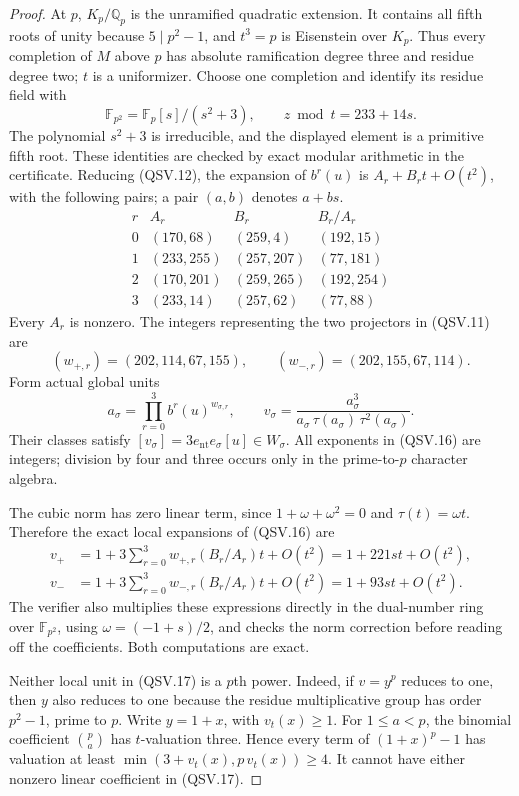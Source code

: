 \begin{proof}
At \(p\), \(K_p/\mathbb Q_p\) is the unramified quadratic
extension.  It contains all fifth roots of unity because
\(5\mid p^2-1\), and \(t^3=p\) is Eisenstein over \(K_p\).
Thus every completion of \(M\) above \(p\) has absolute
ramification degree three and residue degree two; \(t\) is a
uniformizer.  Choose one completion and identify its residue
field with
\[
       \mathbb F_{p^2}=\mathbb F_p[s]/(s^2+3),\qquad
       z\bmod t=233+14s .
 \tag{QSV.13}
\]
The polynomial \(s^2+3\) is irreducible, and the displayed element
is a primitive fifth root.  These identities are checked by exact
modular arithmetic in the certificate.
Reducing (QSV.12), the expansion of \(b^r(u)\) is
\(A_r+B_rt+O(t^2)\), with the following pairs; a pair \((a,b)\)
denotes \(a+bs\).
\[
 \begin{array}{c|c|c|c}
 r&A_r&B_r&B_r/A_r\\ \hline
 0&(170,68)&(259,4)&(192,15)\\
 1&(233,255)&(257,207)&(77,181)\\
 2&(170,201)&(259,265)&(192,254)\\
 3&(233,14)&(257,62)&(77,88)
 \end{array}
 \tag{QSV.14}
\]
Every \(A_r\) is nonzero.  The integers representing the two
projectors in (QSV.11) are
\[
      (w_{+,r})=(202,114,67,155),\qquad
      (w_{-,r})=(202,155,67,114).
 \tag{QSV.15}
\]
Form actual global units
\[
 a_\sigma=\prod_{r=0}^3 b^r(u)^{w_{\sigma,r}},\qquad
 v_\sigma=\frac{a_\sigma^3}
                 {a_\sigma\,\tau(a_\sigma)\,\tau^2(a_\sigma)} .
 \tag{QSV.16}
\]
Their classes satisfy
\([v_\sigma]=3e_{\mathrm{nt}}e_\sigma[u]\in W_\sigma\).
All exponents in (QSV.16) are integers; division by four and
three occurs only in the prime-to-\(p\) character algebra.

The cubic norm has zero linear term, since
\(1+\omega+\omega^2=0\) and \(\tau(t)=\omega t\).
Therefore the exact local expansions of (QSV.16) are
\[
 \begin{split}
 v_+&=1+
       3\sum_{r=0}^3w_{+,r}(B_r/A_r)t+O(t^2)
          =1+221st+O(t^2),\\
 v_-&=1+
       3\sum_{r=0}^3w_{-,r}(B_r/A_r)t+O(t^2)
          =1+93st+O(t^2).
 \end{split}
 \tag{QSV.17}
\]
The verifier also multiplies these expressions directly in the
dual-number ring over \(\mathbb F_{p^2}\), using
\(\omega=(-1+s)/2\), and checks the norm correction before
reading off the coefficients.  Both computations are exact.

Neither local unit in (QSV.17) is a \(p\)th power.  Indeed, if
\(v=y^p\) reduces to one, then \(y\) also reduces to one because
the residue multiplicative group has order \(p^2-1\), prime to
\(p\).  Write \(y=1+x\), with \(v_t(x)\ge1\).
For \(1\le a<p\), the binomial coefficient \(\binom pa\) has
\(t\)-valuation three.  Hence every term of
\((1+x)^p-1\) has valuation at least
\(\min(3+v_t(x),p\,v_t(x))\ge4\).
It cannot have either nonzero linear coefficient in (QSV.17).


\end{proof}
